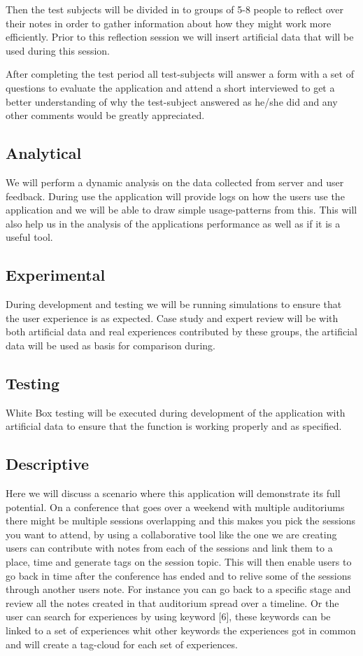 Then the test subjects will be divided in to groups of 5-8 people to reflect over their notes in order to gather information about how they might work more efficiently. Prior to this reflection session we will insert artificial data that will be used during this session.

After completing the test period all test-subjects will answer a form with a set of questions to evaluate the application and attend a short interviewed to get a better understanding of why the test-subject answered as he/she did and any other comments would be greatly appreciated.
\subsection{Analytical}
We will perform a dynamic analysis on the data collected from server and user feedback. During use the application will provide logs on how the users use the application and we will be able to draw simple usage-patterns from this. This will also help us in the analysis of the applications performance as well as if it is a useful tool.
\subsection{Experimental}
During development and testing we will be running simulations to ensure that the user experience is as expected. Case study and expert review will be with both artificial data and real experiences contributed by these groups, the artificial data will be used as basis for comparison during.
\subsection{Testing}
White Box testing will be executed during development of the application with artificial data to ensure that the function is working properly and as specified.
\subsection{Descriptive}
Here we will discuss a scenario where this application will demonstrate its full potential.
On a conference that goes over a weekend with multiple auditoriums there might be multiple sessions overlapping and this makes you pick the sessions you want to attend, by using a collaborative tool like the one we are creating users can contribute with notes from each of the sessions and link them to a place, time and generate tags on the session topic. 
This will then enable users to go back in time after the conference has ended and to relive some of the sessions through another users note. For instance you can go back to a specific stage and review all the notes created in that auditorium spread over a timeline. Or the user can search for experiences by using keyword [6], these keywords can be linked to a set of experiences whit other keywords the experiences got in common and will create a tag-cloud for each set of experiences.
